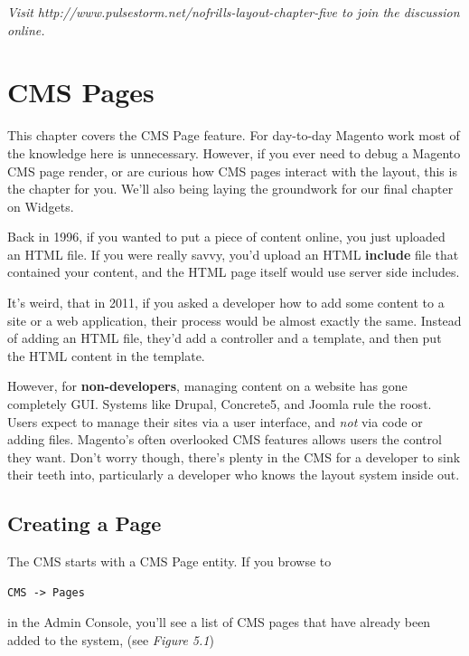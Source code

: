 \documentclass[oneside]{book}
\begin{document}
\emph{Visit http://www.pulsestorm.net/nofrills-layout-chapter-five to join the discussion online.}
\chapter{CMS Pages}
This chapter covers the CMS Page feature.  For day-to-day Magento work most of the knowledge here is unnecessary.  However, if you ever need to debug a Magento CMS page render, or are curious how CMS pages interact with the layout, this is the chapter for you.  We'll also being laying the groundwork for our final chapter on Widgets.

Back in 1996, if you wanted to put a piece of content online, you just uploaded an HTML file.  If you were really savvy, you'd upload an HTML \textbf{include} file that contained your content, and the HTML page itself would use server side includes. 

It's weird, that in 2011, if you asked a developer how to add some content to a site or a web application, their process would be almost exactly the same.  Instead of adding an HTML file, they'd add a controller and a template, and then put the HTML content in the template.

However, for \textbf{non-developers}, managing content on a website has gone completely GUI.  Systems like Drupal, Concrete5, and Joomla rule the roost.  Users expect to manage their sites via a user interface, and \emph{not} via code or adding files.  Magento's often overlooked CMS features allows users the control they want. Don't worry though, there's plenty in the CMS for a developer to sink their teeth into, particularly a developer who knows the layout system inside out. 

\section{Creating a Page}

The CMS starts with a CMS Page entity. If you browse to 

\begin{lstlisting}
CMS -> Pages 

\end{lstlisting}


in the Admin Console, you'll see a list of CMS pages that have already been added to the system, (see \emph{Figure 5.1}) 
\end{document}
